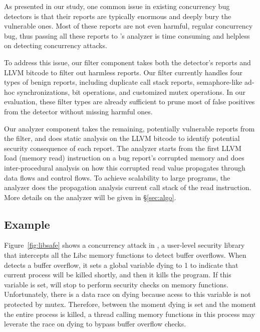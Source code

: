 As presented in our study, one common issue in existing concurrency bug 
detectors is that their reports are typically enormous and deeply 
bury the vulnerable ones. Most of these reports are not even harmful, regular 
concurrency bug, thus passing all these reports to \xxx's analyzer is time 
consuming and helpless on detecting concurrency attacks.

To address this issue, our filter component takes both the detector's reports 
and LLVM bitcode to filter out harmless reports. Our filter currently handles 
four types of benign reports, including duplicate call stack reports, 
semaphore-like ad-hoc synchronizations, bit operations, and customized mutex 
operations. In our evaluation, these filter types are already sufficient to 
prune most of false positives from the detector without missing harmful ones.

Our analyzer component takes the remaining, potentially vulnerable reports from 
the filter, and does static analysis on the LLVM bitcode to identify potential 
security consequence of each report. The analyzer starts from the first LLVM 
\v{load} (memory read) instruction on a bug report's corrupted memory and does 
inter-procedural analysis on how this corrupted read value propagates through 
data flows and control flows. To achieve scalability to large programs, the 
analyzer does the propagation analysis \wrt current call stack of the 
read instruction. More details on the analyzer will be given in 
\S\ref{sec:algo}.

\subsection{Example}\label{sec:example}
% 

Figure~\ref{fig:libsafe} shows a concurrency attack in \libsafe, a user-level 
security library that intercepts all the Libc memory functions to detect buffer 
overflows. When \libsafe detects a buffer overflow, it sets a global variable 
\v{dying} to 1 to indicate that current process will be killed shortly, and 
then it kills the program. If this variable is set, \libsafe will stop to 
perform security checks on memory functions. Unfortunately, there is a data 
race on \v{dying} because acess to this variable is not protected by mutex. 
Therefore, between the moment \v{dying} is set and the moment the entire process 
is killed, a thread calling memory functions in this process may leverate the 
race on \v{dying} to bypass buffer overflow checks.

